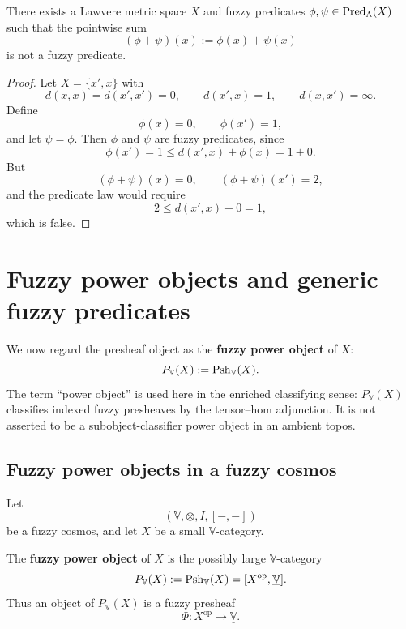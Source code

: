\begin{proposition}
\label{prop:lawvere-pointwise-addition-not-closed}
    There exists a Lawvere metric space \(X\) and fuzzy predicates \(\phi,\psi\in \mathrm{Pred}_\Lambda(X)\) such that the pointwise sum
    \[
        (\phi+\psi)(x):=\phi(x)+\psi(x)
    \]
    is not a fuzzy predicate.
\end{proposition}

\begin{proof}
    Let \(X=\{x',x\}\) with
    \[
        d(x,x)=d(x',x')=0,
        \qquad
        d(x',x)=1,
        \qquad
        d(x,x')=\infty.
    \]
    Define
    \[
        \phi(x)=0,
        \qquad
        \phi(x')=1,
    \]
    and let \(\psi=\phi\). Then \(\phi\) and \(\psi\) are fuzzy predicates, since
    \[
        \phi(x')=1\leq d(x',x)+\phi(x)=1+0.
    \]
    But
    \[
        (\phi+\psi)(x)=0,
        \qquad
        (\phi+\psi)(x')=2,
    \]
    and the predicate law would require
    \[
        2\leq d(x',x)+0=1,
    \]
    which is false.
\end{proof}

\section{Fuzzy power objects and generic fuzzy predicates}
\label{sec:fuzzy-power-objects-and-generic-fuzzy-predicates}

We now regard the presheaf object as the \textbf{fuzzy power object} of \(X\):
\[
    P_{\mathbb V}(X):=\mathrm{Psh}_{\mathbb V}(X).
\]
The term ``power object'' is used here in the enriched classifying sense: \(P_{\mathbb V}(X)\) classifies indexed fuzzy presheaves by the tensor--hom adjunction. It is not asserted to be a subobject-classifier power object in an ambient topos.

\subsection{Fuzzy power objects in a fuzzy cosmos}
\label{subsec:power-objects-in-a-fuzzy-cosmos}

Let
\[
    (\mathbb V,\otimes,I,[-,-])
\]
be a fuzzy cosmos, and let \(X\) be a small \(\mathbb V\)-category.

\begin{definition}
\label{def:enriched-power-object}
    The \textbf{fuzzy power object} of \(X\) is the possibly large \(\mathbb V\)-category
    \[
        P_{\mathbb V}(X)
        :=
        \mathrm{Psh}_{\mathbb V}(X)
        =
        [X^{\mathrm{op}},\underline{\mathbb V}].
    \]
    Thus an object of \(P_{\mathbb V}(X)\) is a fuzzy presheaf
    \[
        \Phi:X^{\mathrm{op}}\to \underline{\mathbb V}.
    \]
\end{definition}

